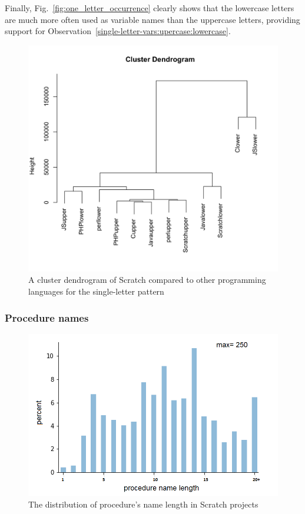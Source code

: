 \documentclass[conference]{IEEEtran}
\begin{document}
Finally, Fig.~\ref{fig:one_letter_occurrence} clearly shows that the lowercase letters are much more often used as variable names than the uppercase letters, providing support for Observation~\ref{single-letter-vars:upercase:lowercase}.

\begin{figure}[tb]
	\begin{center}
		\includegraphics[width=\columnwidth]{fig/cluster_single_letter}
		\caption{A cluster dendrogram of Scratch compared to other programming languages for the single-letter pattern}
		\label{fig:similarity_single_letter}
	\end{center}
\end{figure} 


\subsubsection {Procedure names}
\label{res:proc}
\begin{figure}[tb]
	\begin{center}
		\includegraphics[width=\columnwidth]{fig/funcname_length_occurrence}
		\caption{The distribution of procedure's name length in Scratch projects}
		\label{fig:distribution_of_lengths_func}
	\end{center}
\end{figure} 
\end{document}

